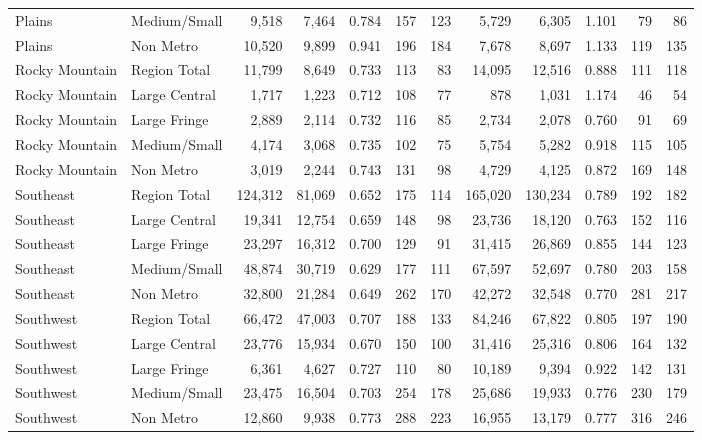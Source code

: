 \documentclass[
]{article}
\begin{document}
\begin{table}
\begin{tabular}[t]{llrrrrrrrrrr}
Plains & Medium/Small & 9,518 & 7,464 & 0.784 & 157 & 123 & 5,729 & 6,305 & 1.101 & 79 & 86\\
Plains & Non Metro & 10,520 & 9,899 & 0.941 & 196 & 184 & 7,678 & 8,697 & 1.133 & 119 & 135\\
\addlinespace[5pt]
Rocky Mountain & Region Total & 11,799 & 8,649 & 0.733 & 113 & 83 & 14,095 & 12,516 & 0.888 & 111 & 118\\
\addlinespace[2pt]
Rocky Mountain & Large Central & 1,717 & 1,223 & 0.712 & 108 & 77 & 878 & 1,031 & 1.174 & 46 & 54\\
Rocky Mountain & Large Fringe & 2,889 & 2,114 & 0.732 & 116 & 85 & 2,734 & 2,078 & 0.760 & 91 & 69\\
Rocky Mountain & Medium/Small & 4,174 & 3,068 & 0.735 & 102 & 75 & 5,754 & 5,282 & 0.918 & 115 & 105\\
Rocky Mountain & Non Metro & 3,019 & 2,244 & 0.743 & 131 & 98 & 4,729 & 4,125 & 0.872 & 169 & 148\\
\addlinespace[5pt]
Southeast & Region Total & 124,312 & 81,069 & 0.652 & 175 & 114 & 165,020 & 130,234 & 0.789 & 192 & 182\\
\addlinespace[2pt]
Southeast & Large Central & 19,341 & 12,754 & 0.659 & 148 & 98 & 23,736 & 18,120 & 0.763 & 152 & 116\\
Southeast & Large Fringe & 23,297 & 16,312 & 0.700 & 129 & 91 & 31,415 & 26,869 & 0.855 & 144 & 123\\
Southeast & Medium/Small & 48,874 & 30,719 & 0.629 & 177 & 111 & 67,597 & 52,697 & 0.780 & 203 & 158\\
Southeast & Non Metro & 32,800 & 21,284 & 0.649 & 262 & 170 & 42,272 & 32,548 & 0.770 & 281 & 217\\
\addlinespace[5pt]
Southwest & Region Total & 66,472 & 47,003 & 0.707 & 188 & 133 & 84,246 & 67,822 & 0.805 & 197 & 190\\
\addlinespace[2pt]
Southwest & Large Central & 23,776 & 15,934 & 0.670 & 150 & 100 & 31,416 & 25,316 & 0.806 & 164 & 132\\
Southwest & Large Fringe & 6,361 & 4,627 & 0.727 & 110 & 80 & 10,189 & 9,394 & 0.922 & 142 & 131\\
Southwest & Medium/Small & 23,475 & 16,504 & 0.703 & 254 & 178 & 25,686 & 19,933 & 0.776 & 230 & 179\\
Southwest & Non Metro & 12,860 & 9,938 & 0.773 & 288 & 223 & 16,955 & 13,179 & 0.777 & 316 & 246\\
\bottomrule
\end{tabular}
\end{table}
\end{document}
